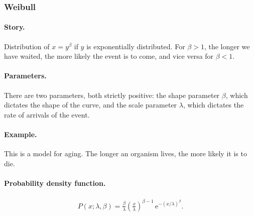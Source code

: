 \subsubsection{Weibull}
\paragraph{Story.} Distribution of $x = y^\beta$ if $y$ is
exponentially distributed.  For $\beta > 1$, the longer we have
waited, the more likely the event is to come, and vice versa for
$\beta < 1$.
\paragraph{Parameters.} There are two parameters, both strictly
positive: the shape parameter $\beta$, which dictates the shape of the
curve, and the scale parameter $\lambda$, which dictates the rate of
arrivals of the event.
\paragraph{Example.} This is a model for aging.  The longer an
organism lives, the more likely it is to die.
\paragraph{Probability density function.}
\begin{align}
P(x;\lambda, \beta) = \frac{\beta}{\lambda}\left(\frac{x}{\lambda}\right)^{\beta - 1}\,
\mathrm{e}^{-(x/\lambda)^\beta}.
\end{align}


